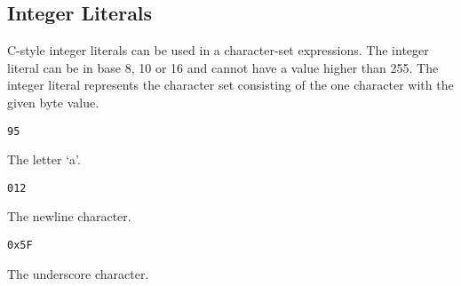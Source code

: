 
\subsection{Integer Literals}
{
	C-style integer literals can be used in a character-set expressions.
	The integer literal can be in base 8, 10 or 16 and cannot have a value
	higher than 255.
	The integer literal represents the character set consisting of the one
	character with the given byte value.
	
	\begin{itemize}
	{
		\item \texttt{95}
		
			The letter `a'.
		
		\item \texttt{012}
		
			The newline character.
		
		\item \texttt{0x5F}
		
			The underscore character.
	}
	\end{itemize}
}
